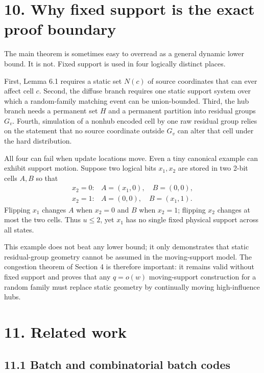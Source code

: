 \documentclass[
]{article}
\begin{document}
\hypertarget{why-fixed-support-is-the-exact-proof-boundary}{%
\section{10. Why fixed support is the exact proof
boundary}\label{why-fixed-support-is-the-exact-proof-boundary}}

The main theorem is sometimes easy to overread as a general dynamic
lower bound. It is not. Fixed support is used in four logically distinct
places.

First, Lemma 6.1 requires a static set \(N(c)\) of source coordinates
that can ever affect cell \(c\). Second, the diffuse branch requires one
static support system over which a random-family matching event can be
union-bounded. Third, the hub branch needs a permanent set \(H\) and a
permanent partition into residual groups \(G_v\). Fourth, simulation of
a nonhub encoded cell by one raw residual group relies on the statement
that no source coordinate outside \(G_v\) can alter that cell under the
hard distribution.

All four can fail when update locations move. Even a tiny canonical
example can exhibit support motion. Suppose two logical bits \(x_1,x_2\)
are stored in two 2-bit cells \(A,B\) so that \[
\begin{array}{ll}
x_2=0:& A=(x_1,0),\quad B=(0,0),\\
x_2=1:& A=(0,0),\quad B=(x_1,1).
\end{array}
\] Flipping \(x_1\) changes \(A\) when \(x_2=0\) and \(B\) when
\(x_2=1\); flipping \(x_2\) changes at most the two cells. Thus
\(u\le2\), yet \(x_1\) has no single fixed physical support across all
states.

This example does not beat any lower bound; it only demonstrates that
static residual-group geometry cannot be assumed in the moving-support
model. The congestion theorem of Section 4 is therefore important: it
remains valid without fixed support and proves that any \(q=o(w)\)
moving-support construction for a random family must replace static
geometry by continually moving high-influence hubs.

\hypertarget{related-work}{%
\section{11. Related work}\label{related-work}}

\hypertarget{batch-and-combinatorial-batch-codes}{%
\subsection{11.1 Batch and combinatorial batch
codes}\label{batch-and-combinatorial-batch-codes}}
\end{document}
